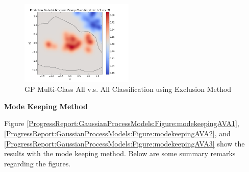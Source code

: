 \begin{figure}[!htbp]
						\includegraphics[width=0.48\textwidth]{Figures/Progress/exclusionAVA/Figure14.png}
					\caption{GP Multi-Class All v.s. All Classification using Exclusion Method}
					\label{ProgressReport:GaussianProcessModels:Figure:exclusionAVA3}
				\end{figure}
				
				\FloatBarrier
				
				\textbf{Mode Keeping Method}
				
				Figure \ref{ProgressReport:GaussianProcessModels:Figure:modekeepingAVA1}, \ref{ProgressReport:GaussianProcessModels:Figure:modekeepingAVA2}, and \ref{ProgressReport:GaussianProcessModels:Figure:modekeepingAVA3} show the results with the mode keeping method. Below are some summary remarks regarding the figures.
				
